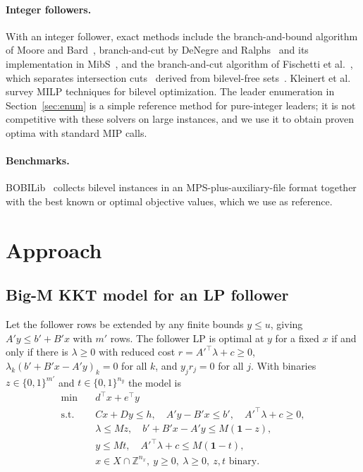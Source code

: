 \documentclass[11pt]{article}
\newcommand{\Z}{\mathbb{Z}}
\begin{document}
\paragraph{Integer followers.} With an integer follower, exact methods
include the branch-and-bound algorithm of Moore and Bard~\cite{moore1990mixed},
branch-and-cut by DeNegre and Ralphs~\cite{denegre2009branch} and its
implementation in MibS~\cite{tahernejad2020branch}, and the branch-and-cut
algorithm of Fischetti et al.~\cite{fischetti2017new}, which separates
intersection cuts~\cite{balas1971intersection} derived from bilevel-free
sets~\cite{fischetti2016intersection, fischetti2018use}. Kleinert et
al.~\cite{kleinert2021survey} survey MILP techniques for bilevel optimization.
The leader enumeration in Section~\ref{sec:enum} is a simple reference method
for pure-integer leaders; it is not competitive with these solvers on large
instances, and we use it to obtain proven optima with standard MIP calls.

\paragraph{Benchmarks.} BOBILib~\cite{thurauf2026bobilib} collects bilevel
instances in an MPS-plus-auxiliary-file format together with the best known
or optimal objective values, which we use as reference.

\section{Approach}
\label{sec:approach}

\subsection{Big-M KKT model for an LP follower}

Let the follower rows be extended by any finite bounds $y \le u$, giving
$A'y \le b' + B'x$ with $m'$ rows. The follower LP is optimal at $y$ for a
fixed $x$ if and only if there is $\lambda \ge 0$ with reduced cost
$r = A'^\top\lambda + c \ge 0$, $\lambda_k (b' + B'x - A'y)_k = 0$ for all
$k$, and $y_j r_j = 0$ for all $j$. With binaries $z \in \{0,1\}^{m'}$ and
$t \in \{0,1\}^{n_y}$ the model is
\begin{align}
\min\quad & d^\top x + e^\top y \nonumber\\
\text{s.t.}\quad & Cx + Dy \le h,\quad A'y - B'x \le b',\quad A'^\top\lambda + c \ge 0, \nonumber\\
& \lambda \le M z,\quad b' + B'x - A'y \le M(\mathbf{1} - z), \label{eq:kkt}\\
& y \le M t,\quad A'^\top\lambda + c \le M(\mathbf{1} - t), \nonumber\\
& x \in X \cap \Z^{n_x},\ y \ge 0,\ \lambda \ge 0,\ z, t \text{ binary}. \nonumber
\end{align}
\end{document}
